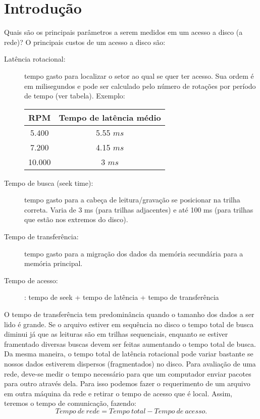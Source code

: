 \documentclass[12pt,a4paper]{article}
\begin{document}
\section{Introdução}
Quais são os principais parâmetros a serem medidos em um acesso a
disco (a rede)?
O principais custos de um acesso a disco são:
\begin{description}
\item [Latência rotacional:] tempo gasto para localizar o 
setor ao qual se quer ter acesso. Sua ordem é em milisegundos e pode
ser calculado pelo número de rotações por período de tempo (ver
tabela). Exemplo:

\begin{table}[h!]
\begin{center}
\begin{tabular}{cc}
\hline
\hline
RPM &  Tempo de latência médio \\
\hline
5.400 & 5.55 $ms$ \\
7.200 & 4.15 $ms$\\
10.000 & 3 $ms$
\end{tabular}
\end{center}
\end{table}

\item [Tempo de busca (seek time):] tempo gasto para a cabeça de 
leitura/gravação se posicionar na trilha correta. Varia de 3 ms (para trilhas adjacentes) e até 100 ms (para trilhas que estão nos extremos do disco).

\item[Tempo de transferência:]  tempo gasto para a 
migração dos dados da memória secundária para a 
memória principal.

\item[Tempo de acesso:]: tempo de seek + tempo de latência + tempo de transferência
\end{description}

O tempo de transferência tem predominância quando o tamanho dos dados
a ser lido é grande.
Se o arquivo estiver em sequência no disco o tempo total de busca diminui
já que as leituras são em trilhas sequenciais, enquanto se estiver
framentado diversas buscas devem ser feitas aumentando o tempo total
de busca.
Da mesma maneira, o tempo total de latência rotacional pode variar bastante
se nossos dados estiverem dispersos (fragmentados) no disco. 
Para  avaliação de uma rede, deve-se medir o tempo necessário para que um computador
enviar pacotes para outro através dela. Para isso podemos fazer o requerimento 
de um arquivo em outra máquina da rede e retirar o tempo de acesso que é local.
Assim, teremos o tempo de comunicação, fazendo:
\begin{equation}
  Tempo~de~rede = Tempo~total - Tempo~de~acesso. 
\end{equation}
\end{document}
